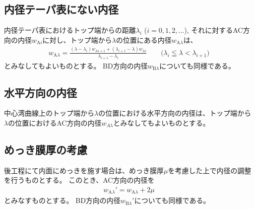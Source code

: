 \subsection{内径テーパ表にない内径}
内径テーパ表におけるトップ端からの距離$\lambda_i$ ($i = 0, 1, 2, ...$), それに対するAC方向の内径$w_{\mathrm Ai}$に対し、トップ端から$\lambda$の位置にある内径$w_{\mathrm A\lambda}$は、
\begin{align*}
  w_{\mathrm A\lambda}
  = \frac{(\lambda-\lambda_i)w_{\mathrm Ai+1}+(\lambda_{i+1}-\lambda)w_{\mathrm Ai}}{\lambda_{i+1}-\lambda_i}
  \qquad
  \Big(\lambda_i \leqq \lambda < \lambda_{i+1}\Big)
\end{align*}
とみなしてもよいものとする。
BD方向の内径$w_{\mathrm B\lambda}$についても同様である。

\subsection{水平方向の内径}
中心湾曲線上のトップ端から$\lambda$の位置における水平方向の内径は、トップ端から$\lambda$の位置におけるAC方向の内径$w_{A\lambda}$とみなしてもよいものとする。

\subsection{めっき膜厚の考慮}
後工程にて内面にめっきを施す場合は、めっき膜厚$\mu$を考慮した上で内径の調整を行うものとする。
このとき、AC方向の内径を
\begin{align*}
  w_{\mathrm A\lambda}' = w_{\mathrm A\lambda}+2\mu
\end{align*}
とみなすものとする。
BD方向の内径$w_{\mathrm B\lambda}'$についても同様である。



\clearpage


